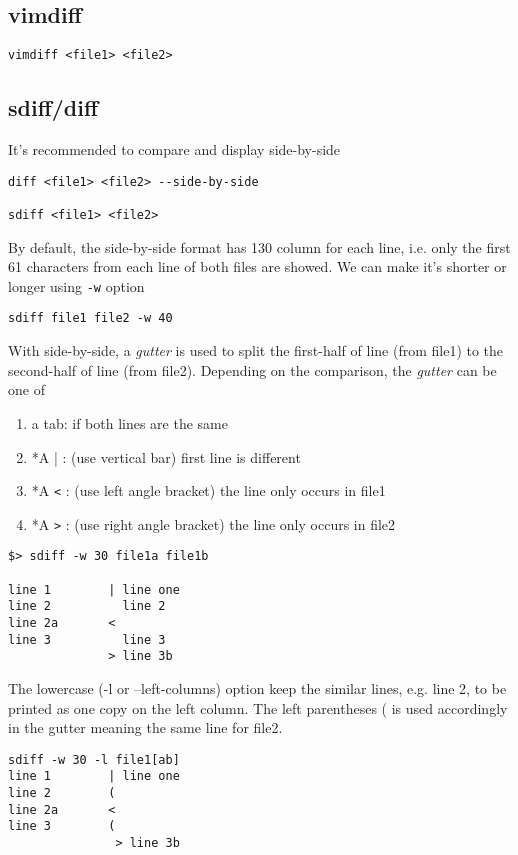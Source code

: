 \subsection{vimdiff}
\label{sec:vimdiff}

\begin{verbatim}
vimdiff <file1> <file2>
\end{verbatim}

\subsection{sdiff/diff}
\label{sec:diff}
\label{sec:sdiff}

It's recommended to compare and display side-by-side
\begin{verbatim}
diff <file1> <file2> --side-by-side

sdiff <file1> <file2>
\end{verbatim}
By default, the side-by-side format has 130 column for each line, i.e. only the
first 61 characters from each line of both files are showed. We can make it's
shorter or longer using \verb!-w! option
\begin{verbatim}
sdiff file1 file2 -w 40
\end{verbatim}

With side-by-side, a {\it gutter } is used to split the first-half of line (from
file1) to the second-half of line (from file2). Depending on the comparison, the
{\it gutter} can be one of 
\begin{enumerate}
  \item a tab: if both lines are the same
  \item *A | : (use vertical bar) first line is different
  \item *A \verb!<! : (use left angle bracket) 	the line only occurs in file1
  \item *A \verb!>! : (use right angle bracket) the line only occurs in file2
\end{enumerate}

\begin{verbatim}
$> sdiff -w 30 file1a file1b

line 1        | line one
line 2          line 2
line 2a       <
line 3          line 3
              > line 3b
\end{verbatim}
The lowercase (-l or --left-columns) option keep the similar lines, e.g. line 2,
to be printed as one copy on the left column. The left parentheses ( is used
accordingly in the gutter meaning the same line for file2.
\begin{verbatim}
sdiff -w 30 -l file1[ab]
line 1        | line one
line 2        (
line 2a       <
line 3        (
               > line 3b
\end{verbatim}


